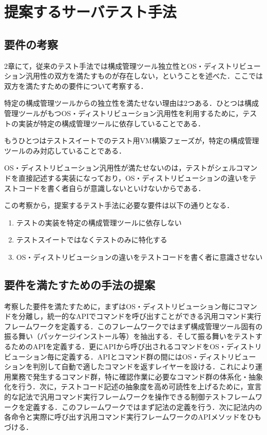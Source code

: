 \section{提案するサーバテスト手法}

\subsection{要件の考察}

2章にて，従来のテスト手法では構成管理ツール独立性とOS・ディストリビューション汎用性の双方を満たすものが存在しない，ということを述べた．ここでは双方を満たすための要件について考察する．

特定の構成管理ツールからの独立性を満たせない理由は2つある．ひとつは構成管理ツールがもつOS・ディストリビューション汎用性を利用するために，テストの実装が特定の構成管理ツールに依存していることである．

もうひとつはテストスイートでのテスト用VM構築フェーズが，特定の構成管理ツールのみ対応していることである．

OS・ディストリビューション汎用性が満たせないのは，テストがシェルコマンドを直接記述する実装になっており，OS・ディストリビューションの違いをテストコードを書く者自らが意識しないといけないからである．

この考察から，提案するテスト手法に必要な要件は以下の通りとなる．

\begin{enumerate}
  \item テストの実装を特定の構成管理ツールに依存しない
  \item テストスイートではなくテストのみに特化する
  \item OS・ディストリビューションの違いをテストコードを書く者に意識させない
\end{enumerate}

\subsection{要件を満たすための手法の提案}

考察した要件を満たすために，まずはOS・ディストリビューション毎にコマンドを分離し，統一的なAPIでコマンドを呼び出すことができる汎用コマンド実行フレームワークを定義する．このフレームワークではまず構成管理ツール固有の振る舞い（パッケージインストール等）を抽出する．そして振る舞いをテストするためのAPIを定義する．更にAPIから呼び出されるコマンドをOS・ディストリビューション毎に定義する．APIとコマンド群の間にはOS・ディストリビューションを判別して自動で適したコマンドを返すレイヤーを設ける．これにより運用業務で発生するコマンド群，特に確認作業に必要なコマンド群の体系化・抽象化を行う．次に，テストコード記述の抽象度を高め可読性を上げるために，宣言的な記法で汎用コマンド実行フレームワークを操作できる制御テストフレームワークを定義する．このフレームワークではまず記法の定義を行う．次に記法内の各命令と実際に呼び出す汎用コマンド実行フレームワークのAPIメソッドをひもづける．

